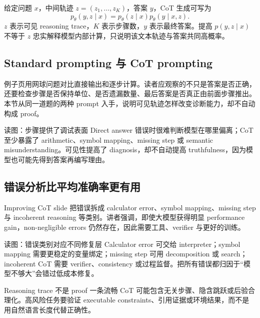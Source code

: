 给定问题 $x$，中间轨迹 $z=(z_1,\ldots,z_K)$，答案 $y$，CoT 生成可写为
\[
p_\theta(y,z\mid x)=p_\theta(z\mid x)p_\theta(y\mid x,z).
\]
$z$ 表示可见 reasoning trace，$K$ 表示步骤数，$y$ 表示最终答案。提高 $p(y,z\mid x)$ 不等于 $z$ 忠实解释模型内部计算，只说明该文本轨迹与答案共同高概率。

\subsection{Standard prompting 与 CoT prompting}

例子页用网球问题对比直接输出和逐步计算。读者应观察的不只是答案是否正确，还要检查步骤是否保持单位、是否遗漏数量、最后答案是否真正由前面步骤推出。本节从同一道题的两种 prompt 入手，说明可见轨迹怎样改变诊断能力，却不自动构成 proof。


\begin{knowledgebox}{读图：步骤提供了调试表面}
Direct answer 错误时很难判断模型在哪里偏离；CoT 至少暴露了 arithmetic、symbol mapping、missing step 或 semantic misunderstanding。可见性提高了 diagnosis，却不自动提高 truthfulness，因为模型也可能先得到答案再编写理由。
\end{knowledgebox}

\subsection{错误分析比平均准确率更有用}

Improving CoT slide 把错误拆成 calculator error、symbol mapping、missing step 与 incoherent reasoning 等类别。讲者强调，即使大模型获得明显 performance gain，non-negligible errors 仍然存在，因此需要工具、verifier 与更好的训练。


\begin{knowledgebox}{读图：错误类别对应不同修复层}
Calculator error 可交给 interpreter；symbol mapping 需要更稳定的变量绑定；missing step 可用 decomposition 或 search；incoherent CoT 需要 verifier、consistency 或过程监督。把所有错误都归因于“模型不够大”会错过低成本修复。
\end{knowledgebox}

\begin{warningbox}{Reasoning trace 不是 proof}
一条流畅 CoT 可能包含无关步骤、隐含跳跃或后验合理化。高风险任务要验证 executable constraints、引用证据或环境结果，而不是用自然语言长度代替正确性。
\end{warningbox}

